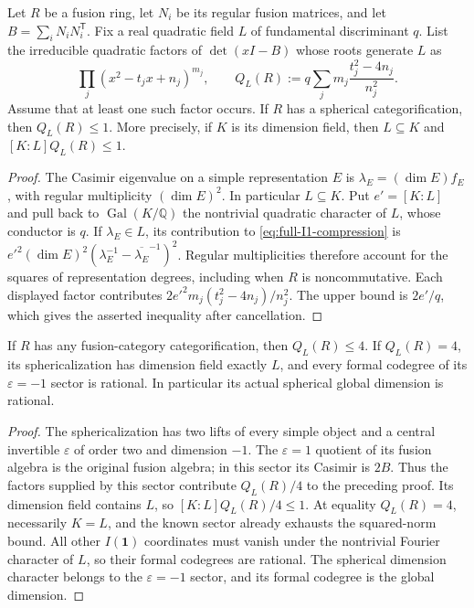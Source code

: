 \begin{corollary}\label{cor:quadratic-Casimir}
Let $R$ be a fusion ring, let $N_i$ be its regular fusion matrices, and let
$B=\sum_iN_iN_i^{\mathsf T}$.  Fix a real quadratic field $L$ of
fundamental discriminant $q$.  List the irreducible quadratic factors of
$\det(xI-B)$ whose roots generate $L$ as
\[
 \prod_j(x^2-t_jx+n_j)^{m_j},
 \qquad
 Q_L(R):=q\sum_jm_j\frac{t_j^2-4n_j}{n_j^2}.
\]
Assume that at least one such factor occurs.  If $R$ has a spherical categorification, then
$Q_L(R)\leq1$.  More precisely, if $K$ is its dimension field, then
$L\subseteq K$ and $[K:L]Q_L(R)\leq1$.
\end{corollary}

\begin{proof}
The Casimir eigenvalue on a simple representation $E$ is
$\lambda_E=(\dim E)f_E$, with regular multiplicity $(\dim E)^2$.
In particular $L\subseteq K$.  Put $e'=[K:L]$ and pull back to
$\operatorname{Gal}(K/\mathbb Q)$ the nontrivial quadratic character of
$L$, whose conductor is $q$.  If $\lambda_E\in L$, its contribution to
\eqref{eq:full-I1-compression} is
$e'^2(\dim E)^2(\lambda_E^{-1}-\overline{\lambda_E}^{-1})^2$.
Regular multiplicities therefore account for the squares of representation
degrees, including when $R$ is noncommutative.  Each displayed factor
contributes $2e'^2m_j(t_j^2-4n_j)/n_j^2$.  The upper bound is $2e'/q$,
which gives the asserted inequality after cancellation.
\end{proof}

\begin{corollary}\label{cor:compression-boundary}
If $R$ has any fusion-category categorification, then $Q_L(R)\leq4$.
If $Q_L(R)=4$, its sphericalization has dimension field exactly $L$,
and every formal codegree of its $\varepsilon=-1$ sector is rational.
In particular its actual spherical global dimension is rational.
\end{corollary}

\begin{proof}
The sphericalization has two lifts of every simple object and a central
invertible $\varepsilon$ of order two and dimension $-1$.
The $\varepsilon=1$ quotient of its fusion algebra is the original fusion
algebra; in this sector its Casimir is $2B$.  Thus the factors supplied by
this sector contribute $Q_L(R)/4$ to the preceding proof.  Its dimension
field contains $L$, so $[K:L]Q_L(R)/4\leq1$.
At equality $Q_L(R)=4$, necessarily $K=L$, and the known sector already
exhausts the squared-norm bound.  All other $I(\mathbf1)$ coordinates must
vanish under the nontrivial Fourier character of $L$, so their formal
codegrees are rational.  The spherical dimension character belongs to the
$\varepsilon=-1$ sector, and its formal codegree is the global dimension.
\end{proof}

